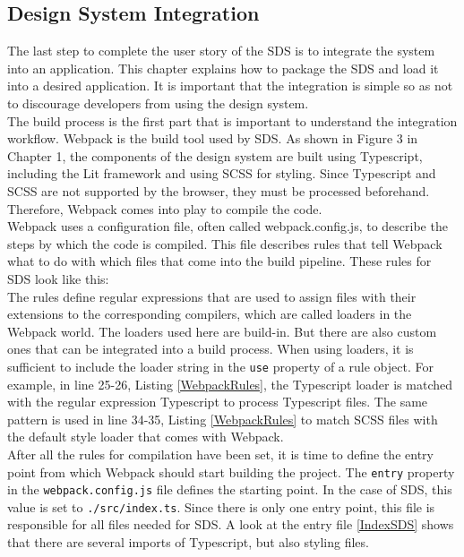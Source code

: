 \subsection{Design System Integration}
The last step to complete the user story of the SDS is to integrate the system into an application. This chapter explains how to package the SDS and load it into a desired application. It is important that the integration is simple so as not to discourage developers from using the design system. \\

The build process is the first part that is important to understand the integration workflow. Webpack is the build tool used by SDS. As shown in Figure 3 in Chapter 1, the components of the design system are built using Typescript, including the Lit framework and using SCSS for styling. Since Typescript and SCSS are not supported by the browser, they must be processed beforehand. Therefore, Webpack comes into play to compile the code. \\
Webpack uses a configuration file, often called webpack.config.js, to describe the steps by which the code is compiled. This file describes rules that tell Webpack what to do with which files that come into the build pipeline. These rules for SDS look like this:\\

The rules define regular expressions that are used to assign files with their extensions to the corresponding compilers, which are called loaders in the Webpack world. The loaders used here are build-in. But there are also custom ones that can be integrated into a build process. When using loaders, it is sufficient to include the loader string in the \texttt{use} property of a rule object. For example, in line 25-26, Listing \ref{WebpackRules}, the Typescript loader is matched with the regular expression Typescript to process Typescript files. The same pattern is used in line 34-35, Listing \ref{WebpackRules} to match SCSS files with the default style loader that comes with Webpack.\\
After all the rules for compilation have been set, it is time to define the entry point from which Webpack should start building the project. The \texttt{entry} property in the \texttt{webpack.config.js} file defines the starting point. In the case of SDS, this value is set to \texttt{./src/index.ts}. Since there is only one entry point, this file is responsible for all files needed for SDS. A look at the entry file \ref{IndexSDS} shows that there are several imports of Typescript, but also styling files.
